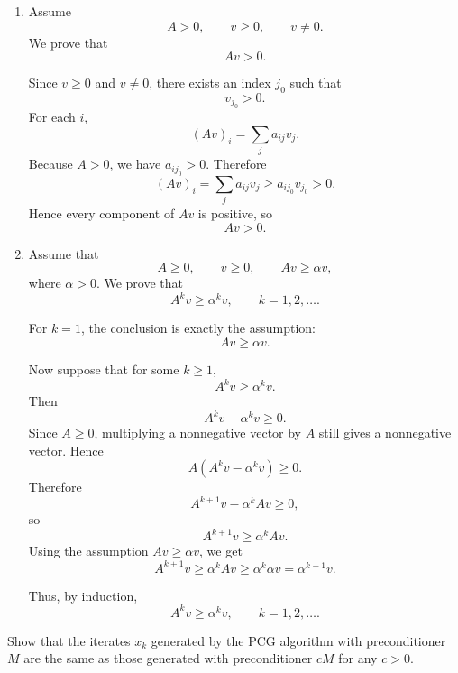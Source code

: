 \documentclass{ctexart}
\begin{document}
\begin{solution}
\begin{enumerate}
    \item[(d)]
      Assume
      \[
        A>0,\qquad v\ge0,\qquad v\ne0.
      \]
      We prove that
      \[
        Av>0.
      \]

      Since \(v\ge0\) and \(v\ne0\), there exists an index \(j_0\) such that
      \[
        v_{j_0}>0.
      \]
      For each \(i\),
      \[
        (Av)_i=\sum_j a_{ij}v_j.
      \]
      Because \(A>0\), we have \(a_{ij_0}>0\). Therefore
      \[
        (Av)_i
        =\sum_j a_{ij}v_j
        \ge a_{ij_0}v_{j_0}>0.
      \]
      Hence every component of \(Av\) is positive, so
      \[
        Av>0.
      \]

    \item[(e)]
      Assume that
      \[
        A\ge 0,\qquad v\ge 0,\qquad Av\ge \alpha v,
      \]
      where \(\alpha>0\). We prove that
      \[
        A^k v\ge \alpha^k v,\qquad k=1,2,\ldots .
      \]

      For \(k=1\), the conclusion is exactly the assumption:
      \[
        Av\ge \alpha v.
      \]

      Now suppose that for some \(k\ge1\),
      \[
        A^k v\ge \alpha^k v.
      \]
      Then
      \[
        A^k v-\alpha^k v\ge0.
      \]
      Since \(A\ge0\), multiplying a nonnegative vector by \(A\) still gives a nonnegative vector. Hence
      \[
        A(A^k v-\alpha^k v)\ge0.
      \]
      Therefore
      \[
        A^{k+1}v-\alpha^k Av\ge0,
      \]
      so
      \[
        A^{k+1}v\ge \alpha^k Av.
      \]
      Using the assumption \(Av\ge \alpha v\), we get
      \[
        A^{k+1}v
        \ge \alpha^k Av
        \ge \alpha^k \alpha v
        =\alpha^{k+1}v.
      \]

      Thus, by induction,
      \[
        A^k v\ge \alpha^k v,\qquad k=1,2,\ldots .
      \]
  \end{enumerate}
\end{solution}
\begin{problem}\label{pro:8}
  Show that the iterates $x_k$ generated by the PCG algorithm with
  preconditioner $M$ are the same as those generated with
  preconditioner $cM$ for any $c>0$.
\end{problem}
\end{document}
